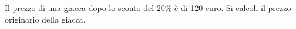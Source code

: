 Il prezzo di una giacca dopo lo sconto del 20\% \`e
di 120 euro. Si calcoli il prezzo originario della giacca.